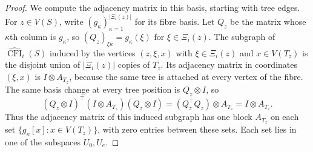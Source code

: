 \documentclass[10pt,a4paper]{article}
\theoremstyle{plain}
\theoremstyle{definition}
\DeclareMathOperator{\CFI}{CFI}
\begin{document}
\begin{proof}
We compute the adjacency matrix in this basis, starting with tree edges.
For $z\in V(S)$, write $(g_\kappa)_{\kappa=1}^{|\Xi_i(z)|}$ for its fibre basis.
Let $Q_z$ be the matrix whose $\kappa$th column is $g_\kappa$, so
$(Q_z)_{\xi\kappa}=g_\kappa(\xi)$ for $\xi\in \Xi_i(z)$.
The subgraph of $\widehat{\CFI}_i(S)$ induced by the vertices $(z,\xi,x)$ with
$\xi\in \Xi_i(z)$ and $x\in V(T_z)$ is the disjoint union of $|\Xi_i(z)|$ copies
of $T_z$. Its adjacency matrix in coordinates $(\xi,x)$ is $I\otimes A_{T_z}$,
because the same tree is attached at every vertex of the fibre.
The same basis change at every tree position is $Q_z\otimes I$, so
\begin{equation}\label{eq:ss-tree-blocks}
 (Q_z\otimes I)^{\top}(I\otimes A_{T_z})(Q_z\otimes I)
 =(Q_z^{\top}Q_z)\otimes A_{T_z}
 =I\otimes A_{T_z}.
\end{equation}
Thus the adjacency matrix of this induced subgraph has one block $A_{T_z}$
on each set $\{g_\kappa[x]:x\in V(T_z)\}$, with zero entries between these sets.
Each set lies in one of the subspaces $U_0,U_e$.


\end{proof}
\end{document}
